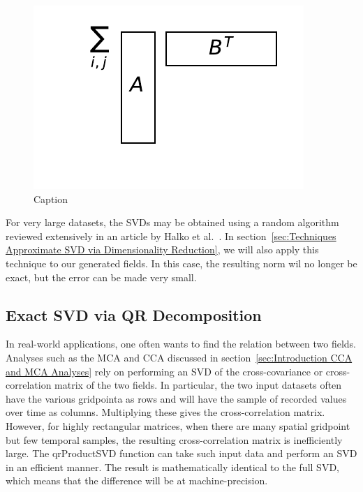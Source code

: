\documentclass{acm_proc_article-sp}
\begin{document}
\begin{figure}[h]
\begin{center}
\includegraphics[scale=0.3]{Results/normDifferenceFromUSVs.pdf}
\caption[Small caption]{Caption}
\label{fig:normDifferenceFromUSVs}
\end{center}
\end{figure}

For very large datasets, the SVDs may be obtained using a random algorithm reviewed extensively in an article by Halko et al.~\cite{Halko2011}. In section~\ref{sec:Techniques Approximate SVD via Dimensionality Reduction}, we will also apply this technique to our generated fields. In this case, the resulting norm wil no longer be exact, but the error can be made very small.

\subsection{Exact SVD via QR Decomposition}
\label{sec:Techniques Exact SVD via QR Decomposition}

In real-world applications, one often wants to find the relation between two fields. Analyses such as the MCA and CCA discussed in section~\ref{sec:Introduction CCA and MCA Analyses} rely on performing an SVD of the cross-covariance or cross-correlation matrix of the two fields. In particular, the two input datasets often have the various gridpointa as rows and will have the sample of recorded values over time as columns. Multiplying these gives the cross-correlation matrix. However, for highly rectangular matrices, when there are many spatial gridpoint but few temporal samples, the resulting cross-correlation matrix is inefficiently large. The qrProductSVD function can take such input data and perform an SVD in an efficient manner. The result is mathematically identical to the full SVD, which means that the difference will be at machine-precision.
\end{document}
